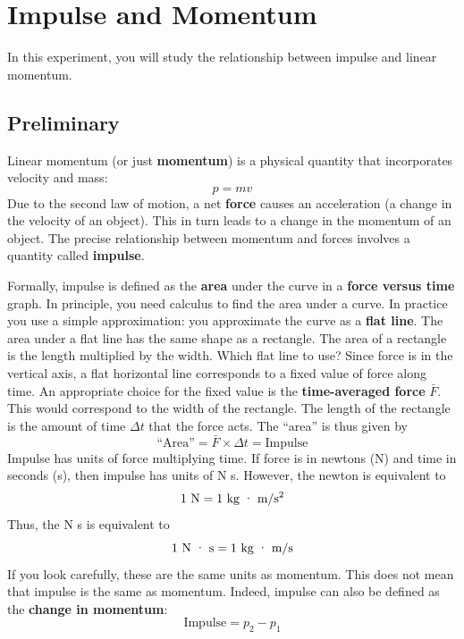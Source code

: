 \setcounter{chapter}{7}
\chapter{Impulse and Momentum}
%
In this experiment, you will study the relationship between impulse and linear momentum.
%
\section{Preliminary}
%
Linear momentum (or just \textbf{momentum}) is a physical quantity that incorporates velocity and mass:
\begin{equation}
    p = m v
\end{equation}
Due to the second law of motion, a net \textbf{force} causes an acceleration (a change in the velocity of an object). This in turn leads to a change in the momentum of an object. The precise relationship between momentum and forces involves a quantity called \textbf{impulse}.

Formally, impulse is defined as the \textbf{area} under the curve in a \textbf{force versus time} graph. In principle, you need calculus to find the area under a curve. In practice you use a simple approximation: you approximate the curve as a \textbf{flat line}. The area under a flat line has the same shape as a rectangle. The area of a rectangle is the length multiplied by the width. Which flat line to use? Since force is in the vertical axis, a flat horizontal line corresponds to a fixed value of force along time. An appropriate choice for the fixed value is the \textbf{time-averaged force} $\bar{F}$. This would correspond to the width of the rectangle. The length of the rectangle is the amount of time $\Delta t$ that the force acts. The ``area'' is thus given by
\begin{equation}
    \text{``Area''} = \bar{F} \times \Delta t = \text{Impulse}
\end{equation}
Impulse has units of force multiplying time. If force is in newtons (N) and time in seconds (s), then impulse has units of N {\textperiodcentered} s. However, the newton is equivalent to
\begin{equation}
    1 \ \text{N} = 1 \ \text{kg {\textperiodcentered} m/s\textsuperscript{2}}
\end{equation}
Thus, the N {\textperiodcentered} s is equivalent to
\begin{equation}
    1 \ \text{N {\textperiodcentered} s} = 1 \ \text{kg {\textperiodcentered} m/s}
\end{equation}
If you look carefully, these are the same units as momentum. This does not mean that impulse is the same as momentum. Indeed, impulse can also be defined as the \textbf{change in momentum}:
\begin{equation}
    \text{Impulse} = p_{2} - p_{1}
\end{equation}
%
